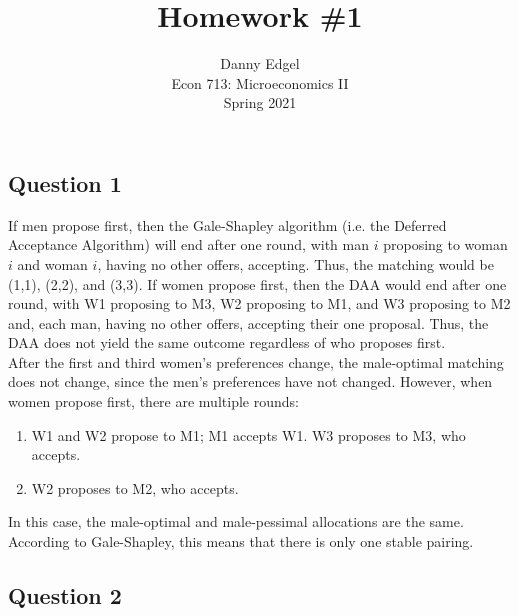 \documentclass{article}
\begin{document}
\title{	Homework \#1 }
\author{ 	Danny Edgel 					\\ 
			Econ 713: Microeconomics II		\\
			Spring 2021						\\
		}
\maketitle\thispagestyle{empty}



\subsection*{Question 1}
If men propose first, then the Gale-Shapley algorithm (i.e. the Deferred Acceptance Algorithm) will end after one round, with man $i$ proposing to woman $i$ and woman $i$, having no other offers, accepting. Thus, the matching would be (1,1), (2,2), and (3,3). If women propose first, then the DAA would end after one round, with W1 proposing to M3, W2 proposing to M1, and W3 proposing to M2 and, each man, having no other offers, accepting their one proposal. Thus, the DAA does not yield the same outcome regardless of who proposes first.
\medskip \\
After the first and third women's preferences change, the male-optimal matching does not change, since the men's preferences have not changed. However, when women propose first, there are multiple rounds:
\begin{enumerate}
	\item W1 and W2 propose to M1; M1 accepts W1. W3 proposes to M3, who accepts.
	\item W2 proposes to M2, who accepts.
\end{enumerate}
In this case, the male-optimal and male-pessimal allocations are the same. According to Gale-Shapley, this means that there is only one stable pairing.

\pagebreak
\subsection*{Question 2}
\end{document}
